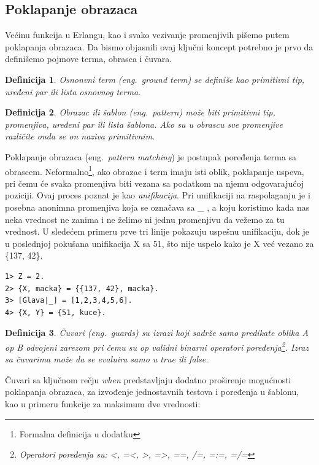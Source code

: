 \documentclass[a4paper]{article}
\newtheorem{definition}{Definicija}
\begin{document}
{\subsection{Poklapanje obrazaca}
Većinu funkcija u Erlangu, kao i svako vezivanje promenjivih pišemo putem poklapanja obrazaca. 
Da bismo objasnili ovaj ključni koncept potrebno je prvo da definišemo pojmove terma, obrasca i čuvara.

\theoremstyle{definition}
\begin{definition}{Osnonvni term (eng.~{\em ground term})}
se definiše kao primitivni tip, uređeni par ili lista osnovnog terma.
\end{definition}

\begin{definition}{Obrazac ili šablon (eng.~{\em pattern})}
može biti primitivni tip, promenjiva, uređeni par ili lista šablona.
Ako su u obrascu sve promenjive različite onda se on naziva primitivnim.
\end{definition}

Poklapanje obrazaca (eng.~{\em pattern matching}) je postupak poređenja terma sa obrascem. 
Neformalno\footnote{Formalna definicija u dodatku}, ako obrazac i term imaju isti oblik, poklapanje uspeva, pri čemu će svaka promenjiva biti vezana sa podatkom na njemu odgovarajućoj poziciji. 
Ovaj proces poznat je kao {\em unifikacija}. 
Pri unifikaciji na raspolaganju je i posebna anonimna promenjiva koja se označava sa \_ , a koju koristimo kada nas neka vrednost ne zanima i ne želimo ni jednu promenjivu da vežemo za tu vrednost. U sledećem primeru prve tri linije pokazuju uspešnu unifikaciju, dok je u poslednjoj pokušana unifikacija X sa 51, što nije uspelo kako je X već vezano za \{137, 42\}.

\begin{verbatim}
1> Z = 2.
2> {X, macka} = {{137, 42}, macka}.
3> [Glava|_] = [1,2,3,4,5,6].
4> {X, Y} = {51, kuce}.
\end{verbatim}

\begin{definition}{Čuvari (eng.~{\em guards})}
su izrazi koji sadrže samo predikate oblika A op B odvojeni zarezom pri čemu su op validni binarni operatori poređenja\footnote{Operatori poređenja su: <, =<, >, =>, ==, /=, =:=, =/=}. Izraz sa čuvarima može da se evaluira samo u true ili false.
\end{definition}
Čuvari sa ključnom rečju {\em when} predstavljaju dodatno proširenje mogućnosti poklapanja obrazaca, za izvođenje jednostavnih testova i poređenja u šablonu, kao u primeru funkcije za maksimum dve vrednosti:

}
\end{document}
